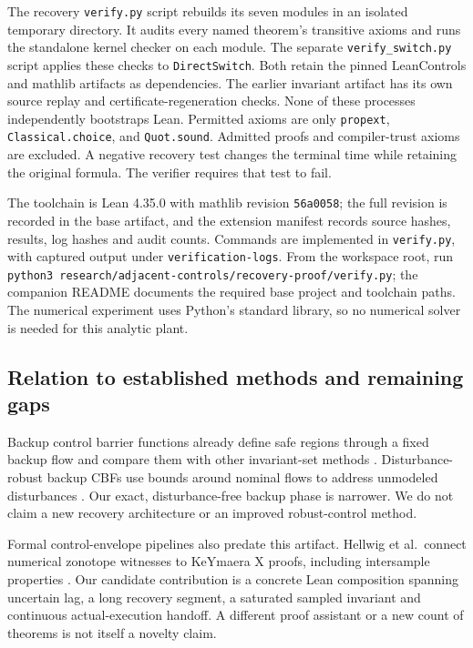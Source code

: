\documentclass[10pt]{article}
\newcommand{\code}[1]{\texttt{#1}}
\begin{document}
The recovery \code{verify.py} script rebuilds its seven modules in an isolated temporary directory. It audits every named theorem's transitive axioms and runs the standalone kernel checker on each module. The separate \code{verify\_switch.py} script applies these checks to \code{DirectSwitch}. Both retain the pinned LeanControls and mathlib artifacts as dependencies. The earlier invariant artifact has its own source replay and certificate-regeneration checks. None of these processes independently bootstraps Lean. Permitted axioms are only \code{propext}, \code{Classical.choice}, and \code{Quot.sound}. Admitted proofs and compiler-trust axioms are excluded. A negative recovery test changes the terminal time while retaining the original formula. The verifier requires that test to fail.

The toolchain is Lean 4.35.0 with mathlib revision \code{56a0058}; the full revision is recorded in the base artifact, and the extension manifest records source hashes, results, log hashes and audit counts. Commands are implemented in \code{verify.py}, with captured output under \code{verification-logs}. From the workspace root, run \texttt{python3 research/adjacent-controls/recovery-proof/verify.py}; the companion README documents the required base project and toolchain paths. The numerical experiment uses Python's standard library, so no numerical solver is needed for this analytic plant.

\subsection{Relation to established methods and remaining gaps}
Backup control barrier functions already define safe regions through a fixed backup flow and compare them with other invariant-set methods \cite{backup}. Disturbance-robust backup CBFs use bounds around nominal flows to address unmodeled disturbances \cite{robustbackup}. Our exact, disturbance-free backup phase is narrower. We do not claim a new recovery architecture or an improved robust-control method.

Formal control-envelope pipelines also predate this artifact. Hellwig et al.\ connect numerical zonotope witnesses to KeYmaera X proofs, including intersample properties \cite{zonotope}. Our candidate contribution is a concrete Lean composition spanning uncertain lag, a long recovery segment, a saturated sampled invariant and continuous actual-execution handoff. A different proof assistant or a new count of theorems is not itself a novelty claim.
\end{document}
